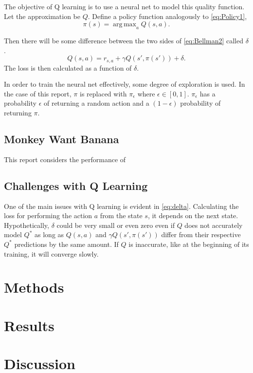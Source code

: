 \documentclass[%
 reprint,
nofootinbib,
 amsmath,amssymb,
 aps,
]{revtex4-1}
\DeclareMathOperator*{\argmax}{arg\,max}
\begin{document}
The objective of Q learning is to use a neural net to model this quality function. Let the approximation be $Q$. Define a policy function analogously to \eqref{eq:Policy1},
\begin{equation}
  \pi(s) = \argmax_a Q(s,a). \label{eq:Policy2}
\end{equation}

 Then there will be some difference between the two sides of \eqref{eq:Bellman2} called $\delta$.
\begin{equation}
  Q(s,a) = r_{s,a} + \gamma Q(s', \pi(s')) + \delta. \label{eq:delta}
\end{equation}
The loss is then calculated as a function of $\delta$.

In order to train the neural net effectively, some degree of exploration is used. In the case of this report, $\pi$ is replaced with $\pi_\epsilon$ where $\epsilon\in[0,1]$. $\pi_\epsilon$ has a probability $\epsilon$ of returning a random action and a $(1-\epsilon)$ probability of returning $\pi$. 

\subsection{\label{sec:Monkey}Monkey Want Banana}
This report considers the performance of 

\subsection{\label{sec:Challenges}Challenges with Q Learning}
One of the main issues with Q learning is evident in \eqref{eq:delta}. Calculating the loss for performing the action $a$ from the state $s$, it depends on the next state. Hypothetically, $\delta$ could be very small or even zero even if $Q$ does not accurately model $Q^*$ as long as $Q(s,a)$ and $\gamma Q(s', \pi(s'))$ differ from their respective $Q^*$ predictions by the same amount. If $Q$ is inaccurate, like at the beginning of its training, it will converge slowly.


\section{\label{sec:Methods}Methods}

\section{\label{sec:Results}Results}

\section{\label{sec:Discussion}Discussion}



\end{document}
